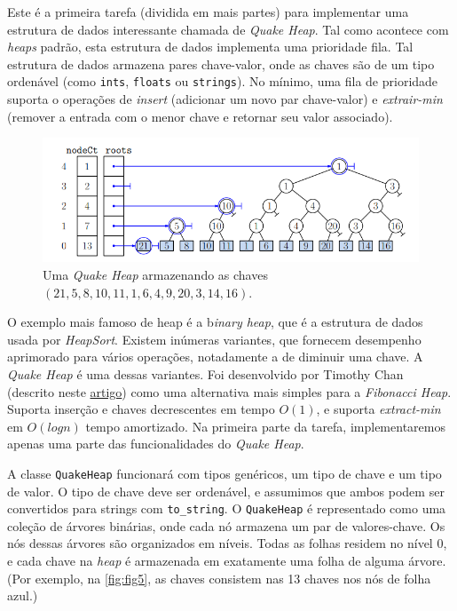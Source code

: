 \documentclass{article}
\begin{document}
Este é a primeira tarefa (dividida em mais partes) para implementar uma estrutura de dados interessante chamada de \textit{Quake Heap}. Tal como acontece com \textit{heaps} padrão, esta estrutura de dados implementa uma prioridade fila. Tal estrutura de dados armazena pares chave-valor, onde as chaves são de um tipo ordenável (como \texttt{ints}, \texttt{floats} ou \texttt{strings}). 
No mínimo, uma fila de prioridade suporta o operações de \textit{insert} (adicionar um novo par chave-valor) e \textit{extrair-min} (remover a entrada com o menor chave e retornar seu valor associado).

\begin{figure}[!h]
    \centering
    \includegraphics[width = 0.8\linewidth]{figures/fig5.png}
    \caption{Uma \textit{Quake Heap} armazenando as chaves $(21, 5, 8, 10, 11, 1, 6, 4, 9, 20, 3, 14, 16)$.}
    \label{fig:fig5}
\end{figure}

O exemplo mais famoso de heap é a b\textit{inary heap}, que é a estrutura de dados usada por \textit{HeapSort}. Existem inúmeras variantes, que fornecem desempenho aprimorado para vários operações, notadamente a de diminuir uma chave. A \textit{Quake Heap} é uma dessas variantes. Foi desenvolvido por Timothy Chan (descrito neste \href{http://tmc.web.engr.illinois.edu/heap_ianfest.pdf}{artigo}) como uma alternativa mais simples para a \textit{Fibonacci Heap}. Suporta inserção e chaves decrescentes em tempo $O(1)$, e suporta \textit{extract-min} em $O(log n)$ tempo amortizado. 
Na primeira parte da tarefa, implementaremos apenas uma parte das funcionalidades do \textit{Quake Heap}.

A classe \texttt{QuakeHeap} funcionará com tipos genéricos, um tipo de chave
e um tipo de valor. O tipo de chave deve ser ordenável, e assumimos que ambos podem ser convertidos para strings com \texttt{to\_string}. 
O \texttt{QuakeHeap}  é representado como uma coleção de árvores binárias, onde cada nó armazena um par de valores-chave. Os nós dessas árvores são organizados em níveis. Todas as folhas residem no nível 0, e cada chave na \textit{heap} é armazenada em exatamente uma folha de alguma árvore. (Por exemplo, na \autoref{fig:fig5},
as chaves consistem nas 13 chaves nos nós de folha azul.)
\end{document}
